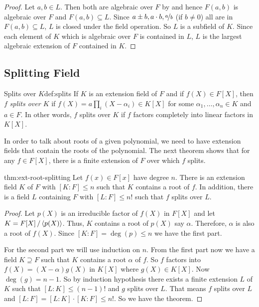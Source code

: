 \begin{proof}
  Let $a,b\in L$.
  Then both are algebraic over $F$ by  and hence $F(a,b)$ is algebraic over $F$ and $F(a,b)\subseteq L$. 
  Since $a\pm b, a\cdot b, \nicefrac{a}{b}$ (if $b\neq 0$) all are in $F(a,b)\subseteq L$, $L$ is closed under the field operation. 
  So $L$ is a subfield of $K$. 
  Since each element of $K$ which is algebraic over $F$ is contained in $L$, $L$ is the largest algebraic extension of $F$ contained in $K$. 
\end{proof}

\subsection{Splitting Field}\label{subsec:splitting-field}

\begin{Definition}{Splits over $K$}{def:splits}
  If $K$ is an extension field of $F$ and if $f(X)\in F[X]$, then $f$ \emph{splits over $K$} if $f(X)=a\prod_i(X-\alpha_i)\in K[X]$ for some $\alpha_1,\ldots,\alpha_n\in K$ and $a\in F$. In other words, $f$ splits over $K$ if $f$ factors completely into linear factors in $K[X]$.
\end{Definition}

In order to talk about roots of a given polynomial, we need to have
extension fields that contain the roots of the polynomial. 
The next theorem shows that for any $f\in F[X]$, there is a finite extension of $F$ over which $f$ splits. 

\begin{Theorem}{}{thm:ext-root-splitting}
  Let $f(x)\in F[x]$ have degree $n$. There is an extension field $K$ of $F$ with $[K:F]\leq n$ such that $K$ contains a root of $f$. In addition, there is a field $L$ containing $F$ with $[L:F]\leq n!$ such that $f$ splits over $L$.
\end{Theorem}
\begin{proof}
  Let $p(X)$ is an irreducible factor of $f(X)$ in $F[X]$ and let $K=\quotient{F[X]}{\la p(X)\ra}$. 
  Thus, $K$ contains a root of $p(X)$ say $\alpha$. 
  Therefore, $\alpha$ is also a root of $f(X)$. 
  Since $[K\colon F]=\deg(p)\leq n$ we have the first part. 

  For the second part we will use induction on $n$. 
  From the first part now we have a field $K\supseteq F$ such that $K$ contains a root $\alpha$ of $f$. 
  So $f$ factors into $f(X)=(X-\alpha)g(X)$ in $K[X]$ where $g(X)\in K[X]$. 
  Now $\deg(g)=n-1$. 
  So by induction hypothesis there exists a finite extension $L$ of $K$ such that $[L\colon K]\leq (n-1)!$ and $g$ splits over $L$. 
  That means $f$ splits over $L$ and $[L\colon F]=[L\colon K]\cdot [K\colon F]\leq n!$. 
  So we have the theorem. 
\end{proof}

